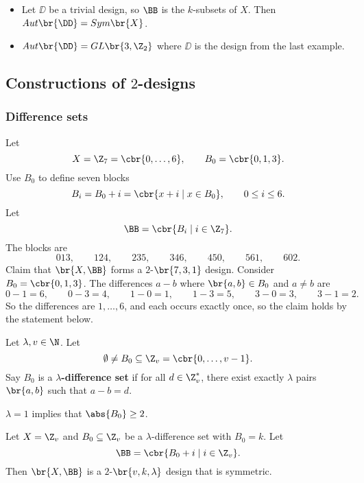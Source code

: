 \begin{example*}
\hfill
\begin{itemize}
\item Let $ \DD $ be a trivial design, so $ \BB $ is the $ k $-subsets of $ X $. Then $ Aut\br{\DD} = Sym\br{X} $.
\item $ Aut\br{\DD} = GL\br{3, \Z_2} $ where $ \DD $ is the design from the last example.
\end{itemize}
\end{example*}

\pagebreak

\subsection{Constructions of $ 2 $-designs}

\subsubsection{Difference sets}

\begin{example*}
Let
$$ X = \Z_7 = \cbr{0, \dots, 6}, \qquad B_0 = \cbr{0, 1, 3}. $$
Use $ B_0 $ to define seven blocks
$$ B_i = B_0 + i = \cbr{x + i \mid x \in B_0}, \qquad 0 \le i \le 6. $$
Let
$$ \BB = \cbr{B_i \mid i \in \Z_7}. $$
The blocks are
$$ 013, \qquad 124, \qquad 235, \qquad 346, \qquad 450, \qquad 561, \qquad 602. $$
Claim that $ \br{X, \BB} $ forms a $ 2 $-$ \br{7, 3, 1} $ design. Consider $ B_0 = \cbr{0, 1, 3} $. The differences $ a - b $ where $ \br{a, b} \in B_0 $ and $ a \ne b $ are
$$ 0 - 1 = 6, \qquad 0 - 3 = 4, \qquad 1 - 0 = 1, \qquad 1 - 3 = 5, \qquad 3 - 0 = 3, \qquad 3 - 1 = 2. $$
So the differences are $ 1, \dots, 6 $, and each occurs exactly once, so the claim holds by the statement below.
\end{example*}

\begin{definition*}
Let $ \lambda, v \in \N $. Let
$$ \emptyset \ne B_0 \subseteq \Z_v = \cbr{0, \dots, v - 1}. $$
Say $ B_0 $ is a \textbf{$ \lambda $-difference set} if for all $ d \in \Z_v^* $, there exist exactly $ \lambda $ pairs $ \br{a, b} $ such that $ a - b = d $.
\end{definition*}

$ \lambda = 1 $ implies that $ \abs{B_0} \ge 2 $.

\begin{proposition}
Let $ X = \Z_v $ and $ B_0 \subseteq \Z_v $ be a $ \lambda $-difference set with $ B_0 = k $. Let
$$ \BB = \cbr{B_0 + i \mid i \in \Z_v}. $$
Then $ \br{X, \BB} $ is a $ 2 $-$ \br{v, k, \lambda} $ design that is symmetric.
\end{proposition}

